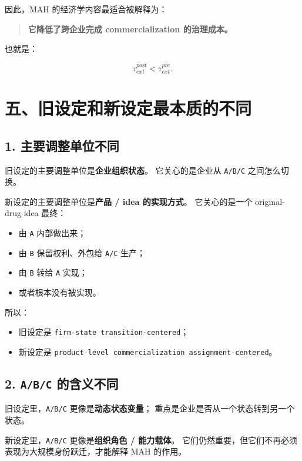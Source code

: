 \documentclass[12pt]{ctexart}
\begin{document}
因此，MAH 的经济学内容最适合被解释为：

\begin{quote}
\textbf{它降低了跨企业完成 commercialization 的治理成本。}
\end{quote}

也就是：

\[
\tau_{ext}^{post}<\tau_{ext}^{pre}.
\]

\section{五、旧设定和新设定最本质的不同}

\subsection*{1. 主要调整单位不同}

旧设定的主要调整单位是\textbf{企业组织状态}。
它关心的是企业从 \texttt{A/B/C} 之间怎么切换。

新设定的主要调整单位是\textbf{产品 / idea 的实现方式}。
它关心的是一个 original-drug idea 最终：

\begin{itemize}[leftmargin=2em]
    \item 由 \texttt{A} 内部做出来；
    \item 由 \texttt{B} 保留权利、外包给 \texttt{A/C} 生产；
    \item 由 \texttt{B} 转给 \texttt{A} 实现；
    \item 或者根本没有被实现。
\end{itemize}

所以：

\begin{itemize}[leftmargin=2em]
    \item 旧设定是 \texttt{firm-state transition-centered}；
    \item 新设定是 \texttt{product-level commercialization assignment-centered}。
\end{itemize}

\subsection*{2. \texttt{A/B/C} 的含义不同}

旧设定里，\texttt{A/B/C} 更像是\textbf{动态状态变量}；
重点是企业是否从一个状态转到另一个状态。

新设定里，\texttt{A/B/C} 更像是\textbf{组织角色 / 能力载体}。
它们仍然重要，但它们不再必须表现为大规模身份跃迁，才能解释 MAH 的作用。
\end{document}
